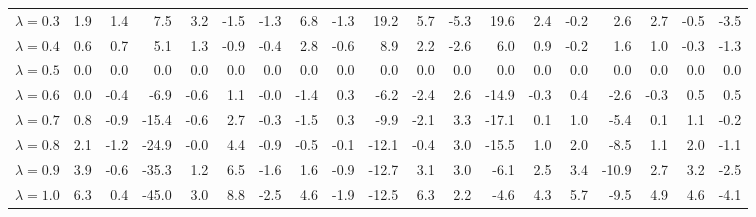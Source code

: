 \begin{table}[H]
{{\begin{tabular}{lrrrrrrrrrrrrrrrrrr}
\rule{0pt}{4ex}$\lambda=0.3$ & 1.9 & 1.4 & 7.5 & 3.2 & -1.5 & -1.3 & 6.8 & -1.3 & 19.2 & 5.7 & -5.3 & 19.6 & 2.4 & -0.2 & 2.6 & 2.7 & -0.5 & -3.5\\
$\lambda=0.4$ & 0.6 & 0.7 & 5.1 & 1.3 & -0.9 & -0.4 & 2.8 & -0.6 & 8.9 & 2.2 & -2.6 & 6.0 & 0.9 & -0.2 & 1.6 & 1.0 & -0.3 & -1.3\\
$\lambda=0.5$ & 0.0 & 0.0 & 0.0 & 0.0 & 0.0 & 0.0 & 0.0 & 0.0 & 0.0 & 0.0 & 0.0 & 0.0 & 0.0 & 0.0 & 0.0 & 0.0 & 0.0 & 0.0\\
$\lambda=0.6$ & 0.0 & -0.4 & -6.9 & -0.6 & 1.1 & -0.0 & -1.4 & 0.3 & -6.2 & -2.4 & 2.6 & -14.9 & -0.3 & 0.4 & -2.6 & -0.3 & 0.5 & 0.5\\
$\lambda=0.7$ & 0.8 & -0.9 & -15.4 & -0.6 & 2.7 & -0.3 & -1.5 & 0.3 & -9.9 & -2.1 & 3.3 & -17.1 & 0.1 & 1.0 & -5.4 & 0.1 & 1.1 & -0.2\\

\rule{0pt}{4ex}$\lambda=0.8$ & 2.1 & -1.2 & -24.9 & -0.0 & 4.4 & -0.9 & -0.5 & -0.1 & -12.1 & -0.4 & 3.0 & -15.5 & 1.0 & 2.0 & -8.5 & 1.1 & 2.0 & -1.1\\
$\lambda=0.9$ & 3.9 & -0.6 & -35.3 & 1.2 & 6.5 & -1.6 & 1.6 & -0.9 & -12.7 & 3.1 & 3.0 & -6.1 & 2.5 & 3.4 & -10.9 & 2.7 & 3.2 & -2.5\\
$\lambda=1.0$ & 6.3 & 0.4 & -45.0 & 3.0 & 8.8 & -2.5 & 4.6 & -1.9 & -12.5 & 6.3 & 2.2 & -4.6 & 4.3 & 5.7 & -9.5 & 4.9 & 4.6 & -4.1\\
\bottomrule
\end{tabular}
} %

} %
\end{table}
